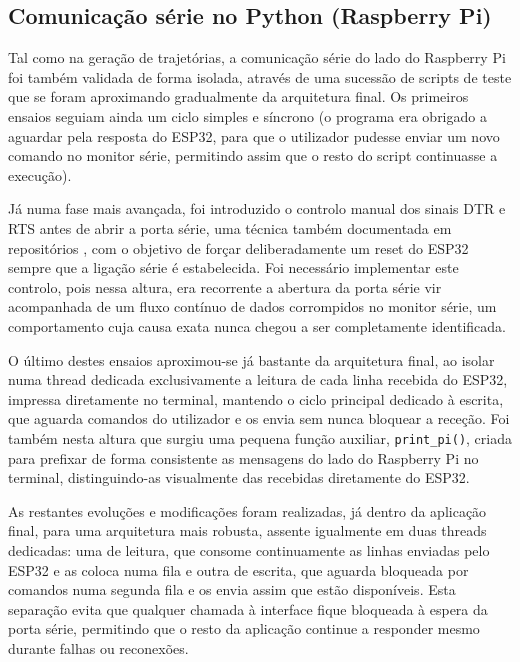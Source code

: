 \clearpage

\subsection{Comunicação série no Python (Raspberry Pi)}
\label{sec:comunicacao-serie-python}
Tal como na geração de trajetórias, a comunicação série do lado do Raspberry Pi foi também validada de forma isolada, através de uma sucessão de scripts de teste que se foram aproximando gradualmente da arquitetura final. Os primeiros ensaios seguiam ainda um ciclo simples e síncrono (o programa era obrigado a aguardar pela resposta do ESP32, para que o utilizador pudesse enviar um novo comando no monitor série, permitindo assim que o resto do script continuasse a execução).

Já numa fase mais avançada, foi introduzido o controlo manual dos sinais DTR e RTS antes de abrir a porta série, uma técnica também documentada em repositórios \parencite{ItayMiz2021}, com o objetivo de forçar deliberadamente um reset do ESP32 sempre que a ligação série é estabelecida. Foi necessário implementar este controlo, pois nessa altura, era recorrente a abertura da porta série vir acompanhada de um fluxo contínuo de dados corrompidos no monitor série, um comportamento cuja causa exata nunca chegou a ser completamente identificada.

O último destes ensaios aproximou-se já bastante da arquitetura final, ao isolar numa thread dedicada exclusivamente a leitura de cada linha recebida do ESP32, impressa diretamente no terminal, mantendo o ciclo principal dedicado à escrita, que aguarda comandos do utilizador e os envia sem nunca bloquear a receção. Foi também nesta altura que surgiu uma pequena função auxiliar, \texttt{print\_pi()}, criada para prefixar de forma consistente as mensagens do lado do Raspberry Pi no terminal, distinguindo-as visualmente das recebidas diretamente do ESP32.

As restantes evoluções e modificações foram realizadas, já dentro da aplicação final, para uma arquitetura mais robusta, assente igualmente em duas threads dedicadas: uma de leitura, que consome continuamente as linhas enviadas pelo ESP32 e as coloca numa fila e outra de escrita, que aguarda bloqueada por comandos numa segunda fila e os envia assim que estão disponíveis. Esta separação evita que qualquer chamada à interface fique bloqueada à espera da porta série, permitindo que o resto da aplicação continue a responder mesmo durante falhas ou reconexões.

